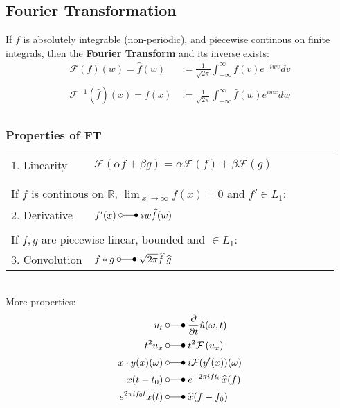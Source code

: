 \subsection{Fourier Transformation}
If $f$ is absolutely integrable (non-periodic), and piecewise continous on finite integrals, 
then the \textbf{Fourier Transform} and its inverse exists:
\begin{align*}
    \mathcal{F}(f)(w)=\widehat{f}(w)&:=\frac1{\sqrt{2\pi}}\int_{-\infty}^{\infty}f(v)e^{-iwv}dv\\\\
    \mathcal{F}^{-1}(\widehat{f})(x)=f(x)&:=\frac1{\sqrt{2\pi}}\int_{-\infty}^{\infty}\widehat{f}(w)e^{iwx}dw\\
\end{align*}
\subsubsection{Properties of FT}


\begin{tabular}[h]{p{0.25\linewidth} p{0.74\linewidth}}
    1. Linearity & $\mathcal{F}(\alpha f+\beta g)=\alpha\mathcal{F}(f)+\beta\mathcal{F}(g)$\\
    &\\
    &\\
    \multicolumn{2}{p{0.9\linewidth}}{If $f$ is continous on $\mathbb{R}$, $\lim_{|x|\to\infty}f(x)=0$ and $f'\in L_1$:}\\
    2. Derivative & $f^{\prime}(x)\;\laplace\;iw\widehat{f}(w)$\\
    &\\
    \multicolumn{2}{p{0.9\linewidth}}{If $f,g$ are piecewise linear, bounded and $\in L_1$:}\\
    3. Convolution & $f*g\;\laplace\;\sqrt{2\pi}\widehat{f}\;\widehat{g}$\\
\end{tabular}\vspace*{8pt}\\
More properties:
\begin{align*}
    u_t&\;\laplace\;\frac\partial{\partial t}\hat{u}(\omega,t) \\
    t^2u_x&\;\laplace\; t^2\mathcal{F}\left(u_x\right) \\
    x\cdot y(x)(\omega)&\;\laplace\;i\mathcal{F}(y^{\prime}(x))(\omega) \\
    x(t-t_0)&\;\laplace\; e^{-2\pi ift_0}\widehat{x}(f)\\
    e^{2\pi if_0t}x(t) &\;\laplace\; \widehat{x}(f-f_0)
\end{align*}

